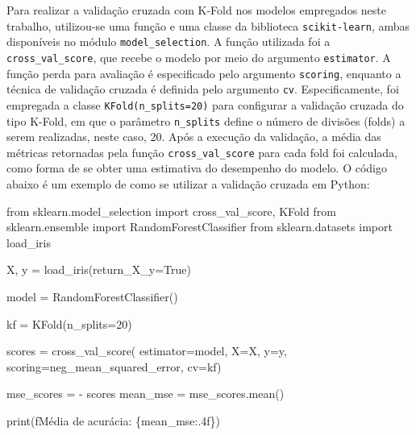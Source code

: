 \documentclass[
  12pt,
  a4paper,
]{scrreprt}
\newenvironment{Shaded}{}{}
\newcommand{\BuiltInTok}[1]{\textcolor[rgb]{0.84,0.23,0.29}{#1}}
\newcommand{\DecValTok}[1]{\textcolor[rgb]{0.00,0.36,0.77}{#1}}
\newcommand{\ImportTok}[1]{\textcolor[rgb]{0.01,0.18,0.38}{#1}}
\newcommand{\NormalTok}[1]{\textcolor[rgb]{0.14,0.16,0.18}{#1}}
\newcommand{\OperatorTok}[1]{\textcolor[rgb]{0.14,0.16,0.18}{#1}}
\newcommand{\SpecialCharTok}[1]{\textcolor[rgb]{0.00,0.36,0.77}{#1}}
\newcommand{\SpecialStringTok}[1]{\textcolor[rgb]{0.01,0.18,0.38}{#1}}
\newcommand{\StringTok}[1]{\textcolor[rgb]{0.01,0.18,0.38}{#1}}
\newcommand{\VariableTok}[1]{\textcolor[rgb]{0.89,0.38,0.04}{#1}}
\begin{document}
Para realizar a validação cruzada com K-Fold nos modelos empregados
neste trabalho, utilizou-se uma função e uma classe da biblioteca
\texttt{scikit-learn}, ambas disponíveis no módulo
\texttt{model\_selection}. A função utilizada foi a
\texttt{cross\_val\_score}, que recebe o modelo por meio do argumento
\texttt{estimator}. A função perda para avaliação é especificado pelo
argumento \texttt{scoring}, enquanto a técnica de validação cruzada é
definida pelo argumento \texttt{cv}. Especificamente, foi empregada a
classe \texttt{KFold(n\_splits=20)} para configurar a validação cruzada
do tipo K-Fold, em que o parâmetro \texttt{n\_splits} define o número de
divisões (folds) a serem realizadas, neste caso, 20. Após a execução da
validação, a média das métricas retornadas pela função
\texttt{cross\_val\_score} para cada fold foi calculada, como forma de
se obter uma estimativa do desempenho do modelo. O código abaixo é um
exemplo de como se utilizar a validação cruzada em Python:

\begin{Shaded}
\begin{Highlighting}[]
\ImportTok{from}\NormalTok{ sklearn.model\_selection }\ImportTok{import}\NormalTok{ cross\_val\_score, KFold}
\ImportTok{from}\NormalTok{ sklearn.ensemble }\ImportTok{import}\NormalTok{ RandomForestClassifier}
\ImportTok{from}\NormalTok{ sklearn.datasets }\ImportTok{import}\NormalTok{ load\_iris}

\NormalTok{X, y }\OperatorTok{=}\NormalTok{ load\_iris(return\_X\_y}\OperatorTok{=}\VariableTok{True}\NormalTok{)}

\NormalTok{model }\OperatorTok{=}\NormalTok{ RandomForestClassifier()}

\NormalTok{kf }\OperatorTok{=}\NormalTok{ KFold(n\_splits}\OperatorTok{=}\DecValTok{20}\NormalTok{)}

\NormalTok{scores }\OperatorTok{=}\NormalTok{ cross\_val\_score(}
\NormalTok{  estimator}\OperatorTok{=}\NormalTok{model,}
\NormalTok{  X}\OperatorTok{=}\NormalTok{X, y}\OperatorTok{=}\NormalTok{y,}
\NormalTok{  scoring}\OperatorTok{=}\StringTok{\textquotesingle{}neg\_mean\_squared\_error\textquotesingle{}}\NormalTok{,}
\NormalTok{  cv}\OperatorTok{=}\NormalTok{kf)}

\NormalTok{mse\_scores }\OperatorTok{=} \OperatorTok{{-}}\NormalTok{ scores}
\NormalTok{mean\_mse }\OperatorTok{=}\NormalTok{ mse\_scores.mean()}

\BuiltInTok{print}\NormalTok{(}\SpecialStringTok{f\textquotesingle{}Média de acurácia: }\SpecialCharTok{\{}\NormalTok{mean\_mse}\SpecialCharTok{:.4f\}}\SpecialStringTok{\textquotesingle{}}\NormalTok{)}
\end{Highlighting}
\end{Shaded}
\end{document}
